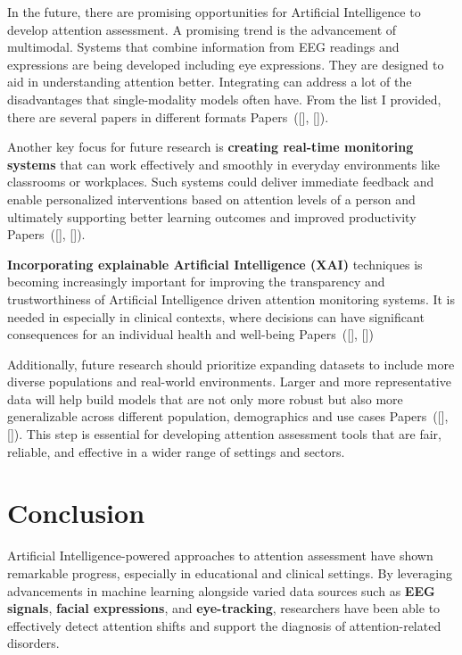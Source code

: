 \documentclass[twocolumn,12pt]{article}
\begin{document}
{In the future, there are promising opportunities for Artificial Intelligence to develop attention assessment. A promising trend is the advancement of multimodal. Systems that combine information from EEG readings and expressions are being developed including eye expressions. They are designed to aid in understanding attention better. Integrating can address a lot of the disadvantages that single-modality models often have. From the list I provided, there are several papers in different formats  Papers~([\citealp{ref1}], [\citealp{ref7}]).

Another key focus for future research is \textbf{creating real-time monitoring systems} that can work effectively and smoothly in everyday environments like classrooms or workplaces. Such systems could deliver immediate feedback and enable personalized interventions based on attention levels of a person and ultimately supporting better learning outcomes and improved productivity Papers~([\citealp{ref6}], [\citealp{ref8}]).

\textbf{Incorporating explainable Artificial Intelligence (XAI)} techniques is becoming increasingly important for improving the transparency and trustworthiness of Artificial Intelligence driven attention monitoring systems. It is needed in especially in clinical contexts, where decisions can have significant consequences for an individual health and well-being Papers~([\citealp{ref10}], [\citealp{ref19}])

Additionally, future research should prioritize expanding datasets to include more diverse populations and real-world environments. Larger and more representative data will help build models that are not only more robust but also more generalizable across different population, demographics and use cases Papers~([\citealp{ref9}], [\citealp{ref16}]). This step is essential for developing attention assessment tools that are fair, reliable, and effective in a wider range of settings and sectors.


\section{Conclusion}

Artificial Intelligence-powered approaches to attention assessment have shown remarkable progress, especially in educational and clinical settings. By leveraging advancements in machine learning alongside varied data sources such as \textbf{EEG signals}, \textbf{facial expressions}, and \textbf{eye-tracking}, researchers have been able to effectively detect attention shifts and support the diagnosis of attention-related disorders.

}
\end{document}
